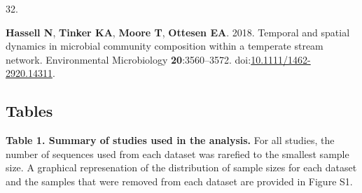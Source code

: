 \documentclass[
]{article}
\newlength{\cslhangindent}
\newlength{\csllabelwidth}
\newlength{\cslentryspacingunit} %
\newenvironment{CSLReferences}[2] %
 {%
  \setlength{\parindent}{0pt}
  \ifodd #1
  \let\oldpar\par
  \def\par{\hangindent=\cslhangindent\oldpar}
  \fi
  \setlength{\parskip}{#2\cslentryspacingunit}
 }%
 {}
\newcommand{\CSLLeftMargin}[1]{\parbox[t]{\csllabelwidth}{#1}}
\newcommand{\CSLRightInline}[1]{\parbox[t]{\linewidth - \csllabelwidth}{#1}\break}
\begin{document}
\begin{CSLReferences}{0}{1}
\leavevmode{}%
\CSLLeftMargin{32. }%
\CSLRightInline{\textbf{Hassell N}, \textbf{Tinker KA}, \textbf{Moore
T}, \textbf{Ottesen EA}. 2018. Temporal and spatial dynamics in
microbial community composition within a temperate stream network.
Environmental Microbiology \textbf{20}:3560--3572.
doi:\href{https://doi.org/10.1111/1462-2920.14311}{10.1111/1462-2920.14311}.}

\end{CSLReferences}


\setlength{\parindent}{0in}
\setlength{\leftskip}{0in}

\newpage

\hypertarget{tables}{%
\subsection{Tables}\label{tables}}

\textbf{Table 1. Summary of studies used in the analysis.} For all
studies, the number of sequences used from each dataset was rarefied to
the smallest sample size. A graphical represenation of the distribution
of sample sizes for each dataset and the samples that were removed from
each dataset are provided in Figure S1.

\small
\end{document}
